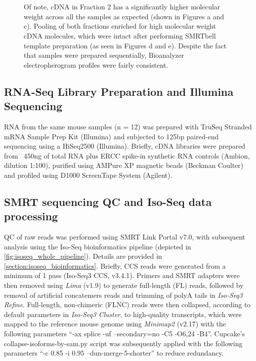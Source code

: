 \begin{figure}[!htp]
{	\\
	\\	 	
	Of note, cDNA in Fraction 2 has a significantly higher molecular weight across all the samples as expected (shown in Figures a and c). Pooling of both fractions enriched for high molecular weight cDNA molecules, which were intact after performing SMRTbell template preparation (as seen in Figures d and e). Despite the fact that samples were prepared sequentially, Bioanalyzer electropherogram profiles were fairly consistent. 
	}
	\label{fig:isoseq_whole_bioresults}
\end{figure}

\clearpage
\subsection{RNA-Seq Library Preparation and Illumina Sequencing}
RNA from the same mouse samples (n = 12) was prepared with TruSeq Stranded mRNA Sample Prep Kit (Illumina) and subjected to 125bp paired-end sequencing using a HiSeq2500 (Illumina)\cite{Castanho2020}. Briefly, cDNA libraries were prepared from ~450ng of total RNA plus ERCC spike-in synthetic RNA controls (Ambion, dilution 1:100), purified using AMPure XP magnetic beads (Beckman Coulter) and profiled using D1000 ScreenTape System (Agilent). 

\subsection{SMRT sequencing QC and Iso-Seq data processing}
QC of raw reads was performed using SMRT Link Portal v7.0, with subsequent analysis using the Iso-Seq bioinformatics pipeline (depicted in \cref{fig:isoseq_whole_pipeline}). Details are provided in \cref{section:isoseq_bioinformatics}. Briefly, CCS reads were generated from a minimum of 1 pass (Iso-Seq3 CCS, v3.4.1). Primers and SMRT adapters were then removed using \textit{Lima} (v1.9) to generate full-length (FL) reads, followed by removal of artificial concatemers reads and trimming of polyA tails in \textit{Iso-Seq3 Refine}. Full-length, non-chimeric (FLNC) reads were then collapsed, according to default parameters in \textit{Iso-Seq3 Cluster}, to high-quality transcripts, which were mapped to the reference mouse genome using \textit{Minimap2} (v2.17) with the following parameters “-ax splice -uf --secondary=no -C5 -O6,24 -B4”. Cupcake’s collapse-isoforms-by-sam.py script was subsequently applied with the following parameters  “-c 0.85 -i 0.95 --dun-merge-5-shorter” to reduce redundancy. 

